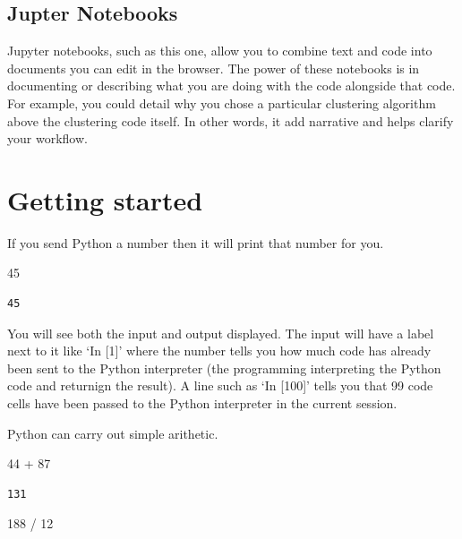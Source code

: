\documentclass[
  letterpaper,
  DIV=11,
  numbers=noendperiod]{scrreprt}
\newenvironment{Shaded}{\begin{snugshade}}{\end{snugshade}}
\newcommand{\DecValTok}[1]{\textcolor[rgb]{0.68,0.00,0.00}{#1}}
\newcommand{\OperatorTok}[1]{\textcolor[rgb]{0.37,0.37,0.37}{#1}}
\begin{document}
\hypertarget{jupter-notebooks}{%
\subsection{Jupter Notebooks}\label{jupter-notebooks}}

Jupyter notebooks, such as this one, allow you to combine text and code
into documents you can edit in the browser. The power of these notebooks
is in documenting or describing what you are doing with the code
alongside that code. For example, you could detail why you chose a
particular clustering algorithm above the clustering code itself. In
other words, it add narrative and helps clarify your workflow.

\hypertarget{getting-started}{%
\section{Getting started}\label{getting-started}}

If you send Python a number then it will print that number for you.

\begin{Shaded}
\begin{Highlighting}[]
\DecValTok{45}
\end{Highlighting}
\end{Shaded}

\begin{verbatim}
45
\end{verbatim}

You will see both the input and output displayed. The input will have a
label next to it like `In {[}1{]}' where the number tells you how much
code has already been sent to the Python interpreter (the programming
interpreting the Python code and returnign the result). A line such as
`In {[}100{]}' tells you that 99 code cells have been passed to the
Python interpreter in the current session.

Python can carry out simple arithetic.

\begin{Shaded}
\begin{Highlighting}[]
\DecValTok{44} \OperatorTok{+} \DecValTok{87}
\end{Highlighting}
\end{Shaded}

\begin{verbatim}
131
\end{verbatim}

\begin{Shaded}
\begin{Highlighting}[]
\DecValTok{188} \OperatorTok{/} \DecValTok{12}
\end{Highlighting}
\end{Shaded}
\end{document}
